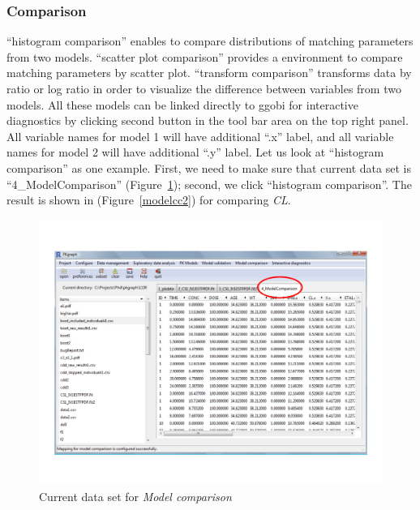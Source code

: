 \documentclass[a4paper]{article}
\begin{document}
\subsubsection{Comparison}
``histogram comparison'' enables to compare distributions of matching parameters from two models. ``scatter plot comparison''  provides a environment to compare matching parameters by scatter plot. ``transform comparison''  transforms data by ratio or log ratio in order to visualize the difference between variables from two models. All these models can be linked directly to ggobi for interactive diagnostics by clicking second button in the tool bar area on the top right panel.
\newline
\newline
All variable names for model 1 will have additional ``.x'' label, and all variable names for model 2 will have additional ``.y'' label.
\newline
\newline
Let us look at ``histogram comparison'' as one example. First, we need to make sure that current data set is ``4\_ModelComparison'' (Figure~\ref{modelcc1}); second, we click ``histogram comparison''. The result is shown in (Figure~\ref{modelcc2}) for comparing \textit{CL}.\begin{figure}[h!tb] \centering
\includegraphics[scale=0.6]{modelcc1.pdf}
\caption{Current data set for \textit{Model comparison}}
\label{modelcc1}
\end{figure}
\end{document}
